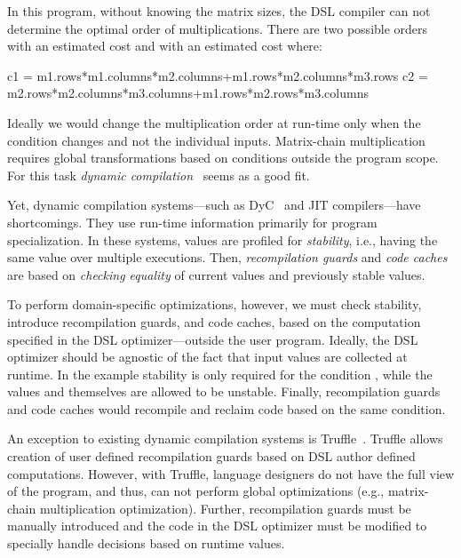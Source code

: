 In this program, without knowing the matrix sizes, the DSL compiler can not determine the
 optimal order of multiplications. There are two possible orders
  with an estimated cost  and  with an estimated cost  where:\begin{lstparagraph}
  c1 = m1.rows*m1.columns*m2.columns+m1.rows*m2.columns*m3.rows
  c2 = m2.rows*m2.columns*m3.columns+m1.rows*m2.rows*m3.columns
\end{lstparagraph}

Ideally we would change the multiplication order at run-time only when the condition
  changes and not the individual inputs. Matrix-chain multiplication
 requires global transformations based on conditions outside the program scope.
 For this task \emph{dynamic compilation}~\cite{auslander1996fast} seems as a good fit.

Yet, dynamic compilation systems---such as DyC~\cite{grant2000dyc} and JIT compilers---have shortcomings.
 They use run-time information primarily for program specialization. In these systems,
 values are profiled for \emph{stability}, i.e., having the same value over multiple executions.
 Then, \emph{recompilation guards} and \emph{code caches} are based on \emph{checking equality}
 of current values and previously stable values.

 To perform domain-specific optimizations, however, we must check stability, introduce recompilation guards,
  and code caches, based on the computation specified in the DSL optimizer---outside the user program.
  Ideally, the DSL optimizer should be agnostic of the fact that input values
  are collected at runtime. In the example stability is only required for the condition , while the values
   and  themselves are allowed to be unstable. Finally, recompilation guards
  and code caches would recompile and reclaim code based on the same condition.

An exception to existing dynamic compilation systems is Truffle~\cite{wurthinger2013one}.
 Truffle allows creation of user defined recompilation guards based on
 DSL author defined computations. However, with Truffle, language designers do not have the full view of the program,
 and thus, can not perform global optimizations (e.g., matrix-chain multiplication optimization).
 Further, recompilation guards must be manually introduced and the code in the DSL optimizer must
 be modified to specially handle decisions based on runtime values.

